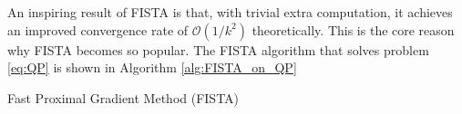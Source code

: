 An inspiring result of FISTA is that, with trivial extra computation, it
achieves an improved convergence rate of $\mathcal O(1/k^2)$ theoretically.
This is the core reason why FISTA becomes so popular.
The FISTA algorithm that solves problem \eqref{eq:QP} is shown in Algorithm
\ref{alg:FISTA_on_QP}

\begin{algorithm}
    \caption{Fast Proximal Gradient Method (FISTA)}
    \label{alg:FISTA_on_QP}
    \begin{algorithmic}[1]
        \smallskip
        \smallskip
        \smallskip
        \smallskip
            \smallskip
            \smallskip
            \smallskip
            \smallskip
        \EndFor
        \smallskip
    \end{algorithmic}
\end{algorithm}

